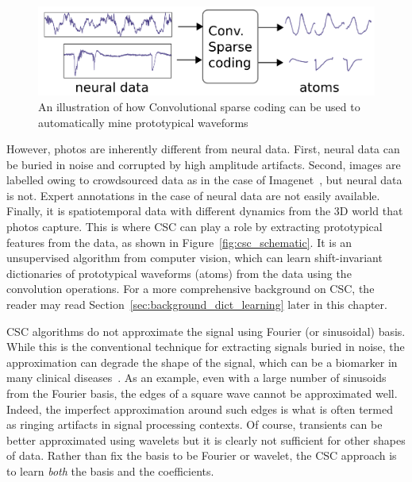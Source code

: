 \begin{figure}[htb]
\begin{center}
   \includegraphics[width=0.85\linewidth]{figures/schema.pdf}
\end{center}
   \caption[Convolutional sparse coding]{An illustration of how Convolutional sparse coding can be used to automatically mine prototypical waveforms}
   \label{fig:sommaire:csc_schematic}
\end{figure}

However, photos are inherently different from neural data. First, neural data can be buried in noise and corrupted by high amplitude artifacts. Second, images are labelled owing to crowdsourced data as in the case of  Imagenet~\citep{deng2009imagenet}, but neural data is not. 
Expert annotations in the case of neural data are not easily available.
Finally, it is spatiotemporal data with different dynamics from the 3D world that photos capture. This is where \ac{CSC} can play a role by extracting prototypical features from the data, as shown in Figure~\ref{fig:csc_schematic}. It is an unsupervised algorithm from computer vision, which can learn shift-invariant dictionaries of prototypical waveforms (atoms) from the data using the convolution operations. For a more comprehensive background on \ac{CSC}, the reader may read Section~\ref{sec:background_dict_learning} later in this chapter.

\ac{CSC} algorithms do not approximate the signal using Fourier (or sinusoidal) basis. While this is the conventional technique for extracting signals buried in noise, the approximation can degrade the shape of the signal, which can be a biomarker in many clinical diseases~\citep{cole2017brain}. As an example, even with a large number of sinusoids from the Fourier basis, the edges of a square wave cannot be approximated well. Indeed, the imperfect approximation around such edges is what is often termed as ringing artifacts in signal processing contexts. Of course, transients can be better approximated using wavelets but it is clearly not sufficient for other shapes of data. Rather than fix the basis to be Fourier or wavelet, the \ac{CSC} approach is to learn \emph{both} the basis and the coefficients.

